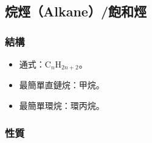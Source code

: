\documentclass[a4paper,12pt]{report}
\begin{document}
\subsection{烷烴（Alkane）/飽和烴}
\subsubsection{結構}
\begin{itemize}
\item 通式：\( \text{C}_n\text{H}_{2n+2} \)。
\item 最簡單直鏈烷：甲烷。
\item 最簡單環烷：環丙烷。
\end{itemize}
\subsubsection{性質}
\end{document}
